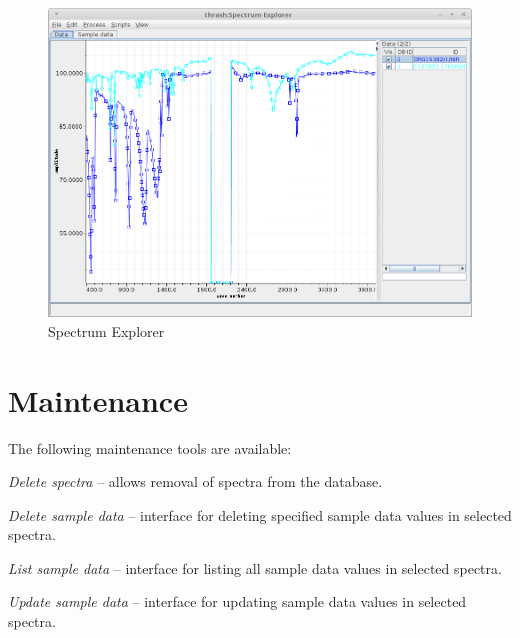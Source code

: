 \documentclass[a4paper]{book}
\begin{document}
\begin{figure}[htb]
  \centering
  \includegraphics[width=12.0cm]{images/spectrum_explorer.png}
  \caption{Spectrum Explorer}
  \label{spectrum_explorer}
\end{figure}

\chapter{Maintenance}
The following maintenance tools are available:
\begin{tight_itemize}
  \item \textit{Delete spectra} -- allows removal of spectra from the database.
  \item \textit{Delete sample data} -- interface for deleting specified sample data values
  in selected spectra.
  \item \textit{List sample data} -- interface for listing all sample data values
  in selected spectra.
  \item \textit{Update sample data} -- interface for updating sample data values
  in selected spectra.
\end{tight_itemize}


\end{document}
